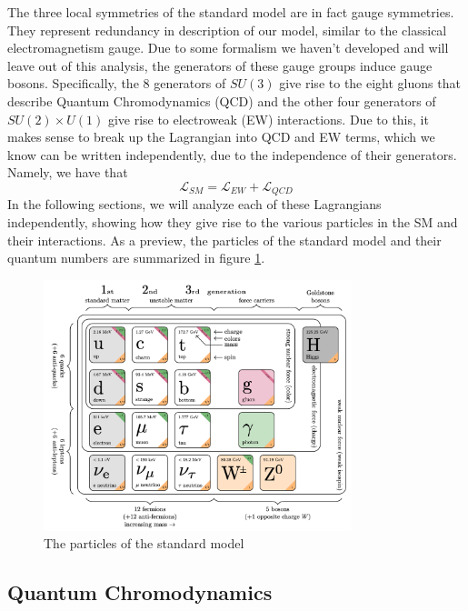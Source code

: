 The three local symmetries of the standard model are in fact gauge symmetries. They represent redundancy in description of our model, similar to the classical electromagnetism gauge. Due to some formalism we haven't developed and will leave out of this analysis, the generators of these gauge groups induce gauge bosons. Specifically, the 8 generators of $SU(3)$ give rise to the eight gluons that describe Quantum Chromodynamics (QCD) and the other four generators of $SU(2) \times U(1)$ give rise to electroweak (EW) interactions. Due to this, it makes sense to break up the Lagrangian into QCD and EW terms, which we know can be written independently, due to the independence of their generators. Namely, we have that
\begin{equation}
\mathcal{L}_{SM} = \mathcal{L}_{EW} + \mathcal{L}_{QCD}
\end{equation}
In the following sections, we will analyze each of these Lagrangians independently, showing how they give rise to the various particles in the SM and their interactions. As a preview, the particles of the standard model and their quantum numbers are summarized in figure \ref{fig:particles_of_the_SM}. 

\begin{figure}[ht!]
    \centering
    \includegraphics[width=0.8\textwidth]{figures/chapter2/particles_of_the_SM.png}
    \caption{The particles of the standard model}
    \label{fig:particles_of_the_SM}
\end{figure}

\subsection{Quantum Chromodynamics}

